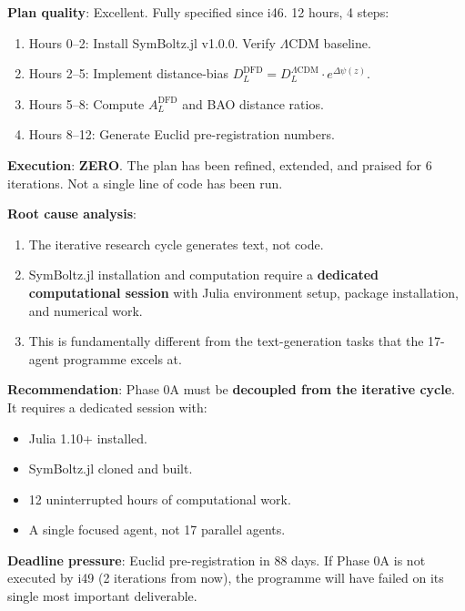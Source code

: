 \documentclass[11pt,a4paper]{article}
\begin{document}
\begin{tcolorbox}[colback=red!5!white, colframe=red!60!black,
  title={CRITICAL: Phase 0A --- Sixth Iteration Without Execution}]

\textbf{Plan quality}: Excellent. Fully specified since i46. 12 hours, 4 steps:
\begin{enumerate}
\item Hours 0--2: Install SymBoltz.jl v1.0.0. Verify $\Lambda$CDM baseline.
\item Hours 2--5: Implement distance-bias $D_L^{\text{DFD}} = D_L^{\Lambda\text{CDM}} \cdot e^{\Delta\psi(z)}$.
\item Hours 5--8: Compute $A_L^{\text{DFD}}$ and BAO distance ratios.
\item Hours 8--12: Generate Euclid pre-registration numbers.
\end{enumerate}

\textbf{Execution}: \textbf{ZERO}. The plan has been refined, extended, and praised for 6 iterations. Not a single line of code has been run.

\textbf{Root cause analysis}:
\begin{enumerate}
\item The iterative research cycle generates text, not code.
\item SymBoltz.jl installation and computation require a \textbf{dedicated computational session} with Julia environment setup, package installation, and numerical work.
\item This is fundamentally different from the text-generation tasks that the 17-agent programme excels at.
\end{enumerate}

\textbf{Recommendation}: Phase 0A must be \textbf{decoupled from the iterative cycle}. It requires a dedicated session with:
\begin{itemize}
\item Julia 1.10+ installed.
\item SymBoltz.jl cloned and built.
\item 12 uninterrupted hours of computational work.
\item A single focused agent, not 17 parallel agents.
\end{itemize}

\textbf{Deadline pressure}: Euclid pre-registration in 88 days. If Phase 0A is not executed by i49 (2 iterations from now), the programme will have failed on its single most important deliverable.
\end{tcolorbox}
\end{document}

